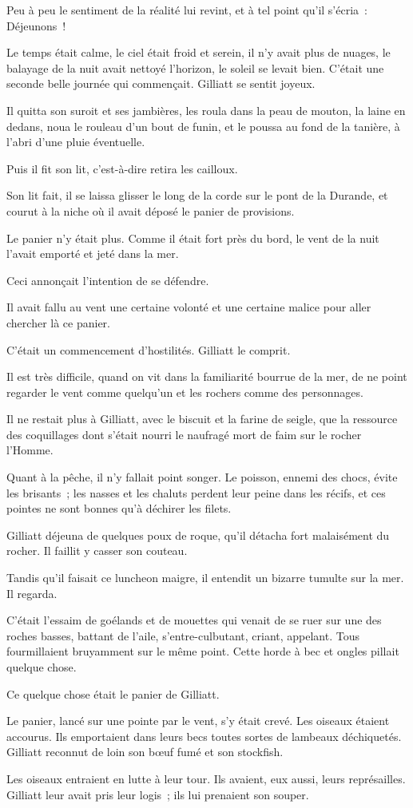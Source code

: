 \documentclass[french,twoside]{book} %
\begin{document}
Peu à peu le sentiment de la réalité lui revint, et à tel point qu’il s’écria : Déjeunons !\par
Le temps était calme, le ciel était froid et serein, il n’y avait plus de nuages, le balayage de la nuit avait nettoyé l’horizon, le soleil se levait bien. C’était une seconde belle journée qui commençait. Gilliatt se sentit joyeux.\par
Il quitta son suroit et ses jambières, les roula dans la peau de mouton, la laine en dedans, noua le rouleau d’un bout de funin, et le poussa au fond de la tanière, à l’abri d’une pluie éventuelle.\par
 Puis il fit son lit, c’est-à-dire retira les cailloux.\par
Son lit fait, il se laissa glisser le long de la corde sur le pont de la Durande, et courut à la niche où il avait déposé le panier de provisions.\par
Le panier n’y était plus. Comme il était fort près du bord, le vent de la nuit l’avait emporté et jeté dans la mer.\par
Ceci annonçait l’intention de se défendre.\par
Il avait fallu au vent une certaine volonté et une certaine malice pour aller chercher là ce panier.\par
C’était un commencement d’hostilités. Gilliatt le comprit.\par
Il est très difficile, quand on vit dans la familiarité bourrue de la mer, de ne point regarder le vent comme quelqu’un et les rochers comme des personnages.\par
Il ne restait plus à Gilliatt, avec le biscuit et la farine de seigle, que la ressource des coquillages dont s’était nourri le naufragé mort de faim sur le rocher l’Homme.\par
Quant à la pêche, il n’y fallait point songer. Le poisson, ennemi des chocs, évite les brisants ; les nasses et les chaluts perdent leur peine dans les récifs, et ces pointes ne sont bonnes qu’à déchirer les filets.\par
Gilliatt déjeuna de quelques poux de roque, qu’il détacha fort malaisément du rocher. Il faillit y casser son couteau.\par
Tandis qu’il faisait ce luncheon maigre, il entendit un bizarre tumulte sur la mer. Il regarda.\par
 C’était l’essaim de goélands et de mouettes qui venait de se ruer sur une des roches basses, battant de l’aile, s’entre-culbutant, criant, appelant. Tous fourmillaient bruyamment sur le même point. Cette horde à bec et ongles pillait quelque chose.\par
Ce quelque chose était le panier de Gilliatt.\par
Le panier, lancé sur une pointe par le vent, s’y était crevé. Les oiseaux étaient accourus. Ils emportaient dans leurs becs toutes sortes de lambeaux déchiquetés. Gilliatt reconnut de loin son bœuf fumé et son stockfish.\par
Les oiseaux entraient en lutte à leur tour. Ils avaient, eux aussi, leurs représailles. Gilliatt leur avait pris leur logis ; ils lui prenaient son souper.
\end{document}

